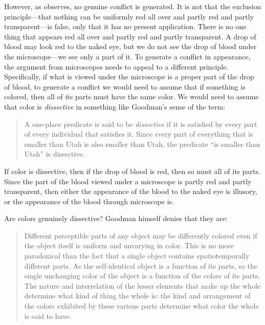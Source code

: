 \documentclass[12pt]{article}
\begin{document}
However, as \citet{Hilbert:1987jq} observes, no genuine conflict is generated. It is not that the exclusion principle---that nothing can be uniformly red all over and partly red and partly transparent---is false, only that it has no present application. There is no one thing that appears red all over and partly red and partly transparent. A drop of blood may look red to the naked eye, but we do not see the drop of blood under the microscope---we see only a part of it. To generate a conflict in appearance, the argument from microscopes needs to appeal to a different principle. Specifically, if what is viewed under the microscope is a proper part of the drop of blood, to generate a conflict we would need to assume that if something is colored, then all of its parts must have the same color. We would need to assume that color is \emph{dissective} in something like Goodman's sense of the term:
\begin{quote}
	A one-place predicate is said to be \emph{dissective} if it is satisfied by every part of every individual that satisfies it. Since every part of everything that is smaller than Utah is also smaller than Utah, the predicate ``is smaller than Utah'' is dissective. \citep[53]{Goodman:1951ww}
\end{quote}
If color is dissective, then if the drop of blood is red, then so must all of its parts. Since the part of the blood viewed under a microscope is partly red and partly transparent, then either the appearance of the blood to the naked eye is illusory, or the appearance of the blood through microscope is.

Are colors genuinely dissective? Goodman himself denies that they are:
\begin{quote}
	Different perceptible parts of any object may be differently colored even if the object itself is uniform and unvarying in color. This is no more paradoxical than the fact that a single object contains spatiotemporally different parts. As the self-identical object is a function of its parts, so the single unchanging color of the object is a function of the colors of its parts. The nature and interrelation of the lesser elements that make up the whole determine what kind of thing the whole is: the kind and arrangement of the colors exhibited by these various parts determine what color the whole is said to have. \citep[130]{Goodman:1951ww}
\end{quote}
\end{document}
